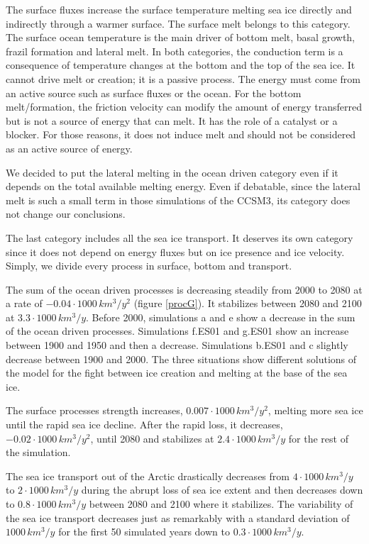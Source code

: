 The surface fluxes increase the surface temperature melting sea ice directly and indirectly through a warmer surface. The surface melt belongs to this category. The surface ocean temperature is the main driver of bottom melt, basal growth, frazil formation and lateral melt. In both categories, the conduction term is a consequence of temperature changes at the bottom and the top of the sea ice. It cannot drive melt or creation; it is a passive process. The energy must come from an active source such as surface fluxes or the ocean.  For the bottom melt/formation, the friction velocity can modify the amount of energy transferred but is not a source of energy that can melt. It has the role of a catalyst or a blocker. For those reasons, it does not induce melt and should not be considered as an active source of energy. 

We decided to put the lateral melting in the ocean driven category even if it depends on the total available melting energy. Even if debatable, since the lateral melt is such a small term in those simulations of the CCSM3, its category does not change our conclusions. 

The last category includes all the sea ice transport. It deserves its own category since it does not depend on energy fluxes but on ice presence and ice velocity. Simply, we divide every process in surface, bottom and transport. 

The sum of the ocean driven processes is decreasing steadily from 2000 to 2080 at a rate  of $-0.04 \cdot 1000 \, km^3/y^2$ (figure \ref{procG}). It stabilizes between 2080 and 2100 at $3.3 \cdot 1000 \, km^3/y$. Before 2000, simulations a and e show a decrease in the sum of the ocean driven processes. Simulations f.ES01 and g.ES01 show an increase between 1900 and 1950 and then a decrease. Simulations b.ES01 and c slightly decrease between 1900 and 2000. The three situations show different solutions of the model for the fight between ice creation and melting at the base of the sea ice.

The surface processes strength increases, $0.007 \cdot 1000 \, km^3/y^2$, melting more sea ice until the rapid sea ice decline. After the rapid loss, it decreases, $-0.02 \cdot 1000 \, km^3/y^2$, until 2080 and stabilizes at $2.4 \cdot 1000 \, km^3/y$ for the rest of the simulation. 

The sea ice transport out of the Arctic drastically decreases from $4 \cdot 1000 \, km^3/y$ to $2 \cdot 1000 \, km^3/y$ during the abrupt loss of sea ice extent and then decreases down to $0.8 \cdot 1000 \, km^3/y$ between 2080 and 2100 where it stabilizes. The variability of the sea ice transport decreases just as remarkably with a standard deviation of $1000 \, km^3/y$ for the first 50 simulated years down to $0.3 \cdot 1000 \, km^3/y$.

